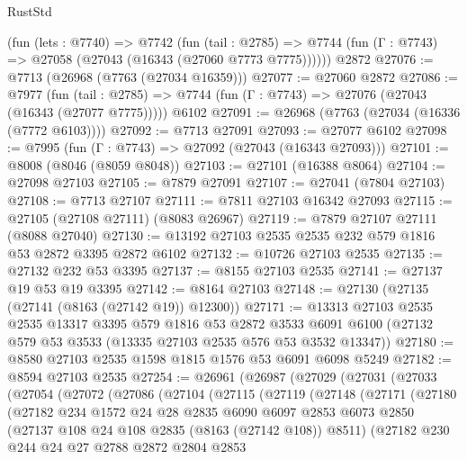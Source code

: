 \begin{lexlean}{RustStd}
\begin{coremodule}
    (fun (lets : @7740) =>
    @7742
      (fun (tail : @2785) =>
      @7744 (fun (Γ : @7743) => @27058 (@27043 (@16343 (@27060 @7773 @7775))))))
    @2872
@27076 := @7713 (@26968 (@7763 (@27034 @16359)))
@27077 := @27060 @2872
@27086 := @7977
    (fun (tail : @2785) => @7744 (fun (Γ : @7743) => @27076 (@27043 (@16343 (@27077 @7775)))))
    @6102
@27091 := @26968 (@7763 (@27034 (@16336 (@7772 @6103))))
@27092 := @7713 @27091
@27093 := @27077 @6102
@27098 := @7995 (fun (Γ : @7743) => @27092 (@27043 (@16343 @27093)))
@27101 := @8008 (@8046 (@8059 @8048))
@27103 := @27101 (@16388 @8064)
@27104 := @27098 @27103
@27105 := @7879 @27091
@27107 := @27041 (@7804 @27103)
@27108 := @7713 @27107
@27111 := @7811 @27103 @16342 @27093
@27115 := @27105 (@27108 @27111) (@8083 @26967)
@27119 := @7879 @27107 @27111 (@8088 @27040)
@27130 := @13192 @27103 @2535 @2535 @232 @579 @1816 @53 @2872 @3395 @2872 @6102
@27132 := @10726 @27103 @2535
@27135 := @27132 @232 @53 @3395
@27137 := @8155 @27103 @2535
@27141 := @27137 @19 @53 @19 @3395
@27142 := @8164 @27103
@27148 := @27130 (@27135 (@27141 (@8163 (@27142 @19)) @12300))
@27171 := @13313
    @27103
    @2535
    @2535
    @13317
    @3395
    @579
    @1816
    @53
    @2872
    @3533
    @6091
    @6100
    (@27132 @579 @53 @3533 (@13335 @27103 @2535 @576 @53 @3532 @13347))
@27180 := @8580 @27103 @2535 @1598 @1815 @1576 @53 @6091 @6098 @5249
@27182 := @8594 @27103 @2535
@27254 := @26961
    (@26987
      (@27029
        (@27031
          (@27033
            (@27054
              (@27072
                (@27086
                  (@27104
                    (@27115
                      (@27119
                        (@27148
                          (@27171
                            (@27180
                              (@27182
                                @234
                                @1572
                                @24
                                @28
                                @2835
                                @6090
                                @6097
                                @2853
                                @6073
                                @2850
                                (@27137 @108 @24 @108 @2835 (@8163 (@27142 @108)) @8511)
                                (@27182
                                  @230
                                  @244
                                  @24
                                  @27
                                  @2788
                                  @2872
                                  @2804
                                  @2853

\end{coremodule}
\end{lexlean}
